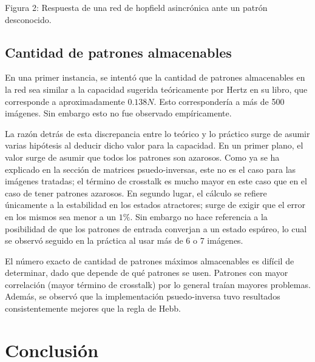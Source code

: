 \documentclass[%
    final,
    reprint,
    notitlepage,
    narroweqnarray,
    inline,
    twoside,
    invited
    ]{ieee}
\begin{document}
\begin{center}
\par Figura 2: Respuesta de una red de hopfield asincrónica ante un patrón desconocido.
\end{center}


\subsection{Cantidad de patrones almacenables}

\par En una primer instancia, se intentó que la cantidad de patrones almacenables en la red 
sea similar a la capacidad sugerida teóricamente por Hertz en su libro, que corresponde a aproximadamente 
$0.138N$. Esto correspondería a más de 500 imágenes. Sin embargo esto no fue observado empíricamente.

\par La razón detrás de esta discrepancia entre lo teórico y lo práctico surge de asumir varias hipótesis 
al deducir dicho valor para la capacidad. En un primer plano, el valor surge de asumir que todos 
los patrones son azarosos. Como ya se ha explicado en la sección de matrices psuedo-inversas, este no 
es el caso para las imágenes tratadas; el término de crosstalk es mucho mayor en 
este caso que en el caso de tener patrones azarosos. En segundo lugar, el cálculo se refiere únicamente 
a la estabilidad en los estados atractores; surge de exigir que el error en los mismos sea menor a 
un $1\%$. Sin embargo no hace referencia a la posibilidad de que los patrones de entrada 
converjan a un estado espúreo, lo cual se observó seguido en la práctica al usar más de 6 o 7 imágenes.

\par El número exacto de cantidad de patrones máximos almacenables es difícil de determinar, dado que 
depende de qué patrones se usen. Patrones con mayor correlación (mayor término de crosstalk) por lo 
general traían mayores problemas. Además, se observó que la implementación psuedo-inversa tuvo resultados 
consistentemente mejores que la regla de Hebb.



\section{Conclusión}




\end{document}
